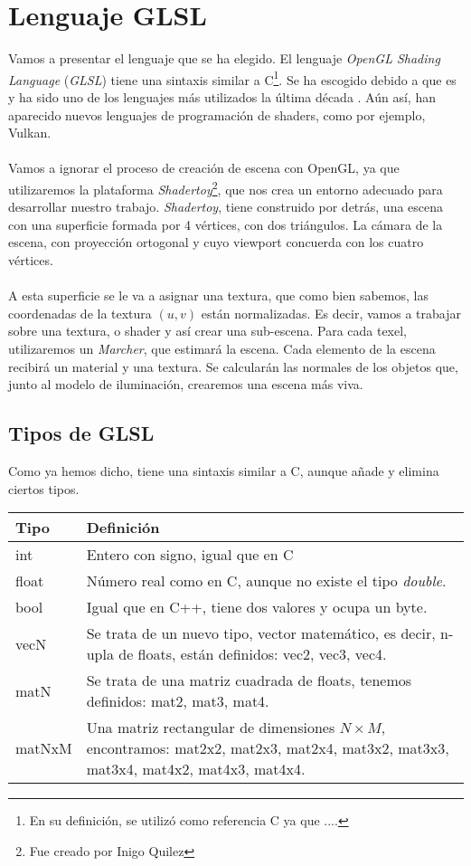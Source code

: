 \chapter{Lenguaje GLSL}
Vamos a presentar el lenguaje que se ha elegido. El lenguaje \textit{OpenGL Shading Language} (\textit{GLSL}) tiene una sintaxis similar a C\footnote{En su definición, se utilizó como referencia C ya que ....}. Se ha escogido debido a que es y ha sido uno de los lenguajes más utilizados la última década %
. Aún así, han aparecido nuevos lenguajes de programación de shaders, como por ejemplo, Vulkan.\\\\
Vamos a ignorar el proceso de creación de escena con OpenGL, ya que utilizaremos la plataforma \textit{Shadertoy}\footnote{Fue creado por Inigo Quilez}, que nos crea un entorno adecuado para desarrollar nuestro trabajo. \textit{Shadertoy}, tiene construido por detrás, una escena con una superficie formada por 4 vértices, con dos triángulos. La cámara de la escena, con proyección ortogonal y cuyo viewport concuerda con los cuatro vértices.\\\\
A esta superficie se le va a asignar una textura, que como bien sabemos, las coordenadas de la textura \((u,v)\) están normalizadas. Es decir, vamos a trabajar sobre una textura, o shader y así crear una sub-escena. Para cada texel, utilizaremos un \textit{Marcher}, que estimará la escena. Cada elemento de la escena recibirá un material y una textura. Se calcularán las normales de los objetos que, junto al modelo de iluminación, crearemos una escena más viva.
\section{Tipos de GLSL}
Como ya hemos dicho, tiene una sintaxis similar a C, aunque añade y elimina ciertos tipos.
\begin{table}[h]
    \begin{tabularx}{\textwidth}{l|X}
      \toprule
      Tipo & Definición\\
      \midrule
      int & Entero con signo, igual que en C\\
      float & Número real como en C, aunque no existe el tipo \textit{double}. \\
      bool & Igual que en C++, tiene dos valores y ocupa un byte. \\
      vecN & Se trata de un nuevo tipo, vector matemático, es decir, n-upla de floats, están definidos: vec2, vec3, vec4. \\
      matN & Se trata de una matriz cuadrada de floats, tenemos definidos: mat2, mat3, mat4. \\
      matNxM & Una matriz rectangular de dimensiones \(N\times M\), encontramos: mat2x2, mat2x3, mat2x4, mat3x2, mat3x3, mat3x4, mat4x2, mat4x3, mat4x4. \\
      \bottomrule
    \end{tabularx}
  \end{table}
\newpage
